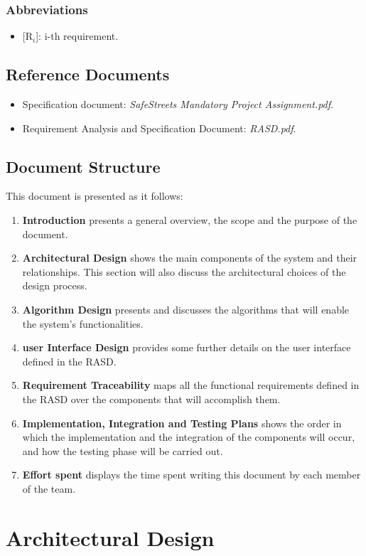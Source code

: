 \documentclass{report}
\begin{document}
\subsection{Abbreviations}
\begin{itemize}
    \item {[R$_{i}$]}: i-th requirement.
    \end{itemize}
\section{Reference Documents}
\begin{itemize}
    \item Specification document: \textit{SafeStreets Mandatory Project Assignment.pdf}.
    \item Requirement Analysis and Specification Document: \textit{RASD.pdf}.
\end{itemize}
\section{Document Structure}
This document is presented as it follows:
\begin{enumerate}
    \item \textbf{Introduction} presents a general overview, the scope and the purpose of the document.
    \item \textbf{Architectural Design} shows the main components of the system and their relationships. This section will also discuss the architectural choices of the design process.
    \item \textbf{Algorithm Design} presents and discusses the algorithms that will enable the system's functionalities.
    \item \textbf{user Interface Design} provides some further details on the user interface defined in the RASD.
    \item \textbf{Requirement Traceability} maps all the functional requirements defined in the RASD over the components that will accomplish them.
    \item \textbf{Implementation, Integration and Testing Plans} shows the order in which the implementation and the integration of the components will occur, and how the testing phase will be carried out.
    \item {\textbf{Effort spent}} displays the time spent writing this document by each member of the team.
\end{enumerate}
\chapter{Architectural Design}
\end{document}
